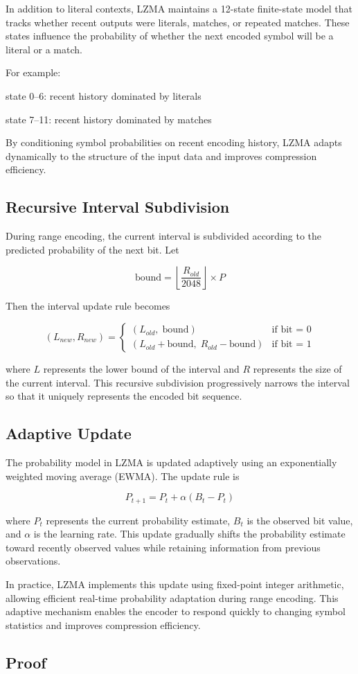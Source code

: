 In addition to literal contexts, LZMA maintains a 12-state finite-state model that tracks whether recent outputs were literals, matches, or repeated matches. These states influence the probability of whether the next encoded symbol will be a literal or a match.

For example:

state 0--6: recent history dominated by literals

state 7--11: recent history dominated by matches

By conditioning symbol probabilities on recent encoding history, LZMA adapts dynamically to the structure of the input data and improves compression efficiency.

\subsection{Recursive Interval Subdivision}

During range encoding, the current interval is subdivided according to the predicted probability of the next bit. Let

\[
\text{bound} = \left\lfloor \frac{R_{old}}{2048} \right\rfloor \times P
\]

Then the interval update rule becomes

\[
(L_{new}, R_{new}) =
\begin{cases}
(L_{old},\; \text{bound}) & \text{if bit = 0} \\[6pt]
(L_{old} + \text{bound},\; R_{old} - \text{bound}) & \text{if bit = 1}
\end{cases}
\]

where $L$ represents the lower bound of the interval and $R$ represents the size of the current interval. This recursive subdivision progressively narrows the interval so that it uniquely represents the encoded bit sequence.

\subsection{Adaptive Update}
The probability model in LZMA is updated adaptively using an exponentially weighted moving average (EWMA). The update rule is

\[
P_{t+1} = P_t + \alpha (B_t - P_t)
\]

where $P_t$ represents the current probability estimate, $B_t$ is the observed bit value, and $\alpha$ is the learning rate. This update gradually shifts the probability estimate toward recently observed values while retaining information from previous observations.

In practice, LZMA implements this update using fixed-point integer arithmetic, allowing efficient real-time probability adaptation during range encoding. This adaptive mechanism enables the encoder to respond quickly to changing symbol statistics and improves compression efficiency.

\subsection{Proof}

